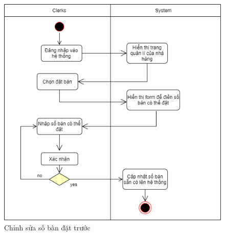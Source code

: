 \begin{figure}[!h]
    \begin{center}
        \includegraphics[scale=0.45]{Images/ActivityDiagram/AD_tables.png}
    \end{center}
    \hspace{0.2cm}
    \caption{Chỉnh sửa số bàn đặt trước}
\end{figure}
\newpage
